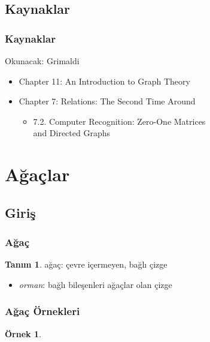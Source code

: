 \documentclass[dvipsnames]{beamer}
\theoremstyle{definition}
\newtheorem{tanim}[theorem]{Tanım}
\theoremstyle{example}
\newtheorem{ornek}[theorem]{Örnek}
\theoremstyle{plain}
\begin{document}
\subsection*{Kaynaklar}

\begin{frame}
  \frametitle{Kaynaklar}

  \begin{block}{Okunacak: Grimaldi}
    \begin{itemize}
      \item Chapter 11: \alert{An Introduction to Graph Theory}

      \item Chapter 7: Relations: The Second Time Around
      \begin{itemize}
        \item 7.2. \alert{Computer Recognition: Zero-One Matrices\\
                          and Directed Graphs}
      \end{itemize}
    \end{itemize}
  \end{block}
\end{frame}

\section{Ağaçlar}

\subsection{Giriş}

\begin{frame}
  \frametitle{Ağaç}

  \begin{tanim}
    \alert{ağaç}: çevre içermeyen, bağlı çizge
  \end{tanim}

  \pause
  \begin{itemize}
    \item \emph{orman}: bağlı bileşenleri ağaçlar olan çizge
  \end{itemize}
\end{frame}

\begin{frame}
  \frametitle{Ağaç Örnekleri}

  \begin{ornek}
    \begin{center}
    \end{center}
  \end{ornek}
\end{frame}
\end{document}
